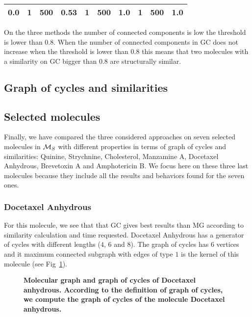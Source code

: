 \documentclass[10pt,letterpaper]{article}
\begin{document}
\begin{table}[!ht]
\begin{adjustwidth}{-0.75in}{0in}
\begin{tabular}{|p{1.5cm}|p{0.8cm}|p{0.8cm}|p{0.8cm}|p{0.8cm}|p{0.8cm}|p{0.8cm}|p{0.8cm}|p{0.8cm}|p{0.8cm}|}
\textbf{0.0} &1&500&0.53&1&500&1.0&1&500&1.0 \\ \hline

 \end{tabular}

\begin{flushleft} On the three methods the number of connected components is low the threshold is lower than $0.8$. When the number of connected components in GC does not increase when the threshold is lower than $0.8$ this means that two molecules with a similarity on GC bigger than $0.8$ are structurally similar.

\end{flushleft}

\label{table4}

\end{adjustwidth}

\end{table}

\subsection*{Graph of cycles and similarities}

\subsection*{Selected molecules}

Finally, we have  compared the three considered approaches  on seven selected molecules in ${\cal M}_S$ with different properties in terms of graph of cycles and similarities: Quinine, Strychnine, Cholesterol, Manzamine A, Docetaxel Anhydrous, Brevetoxin A and Amphotericin B. We focus here on these three last molecules  because they include all the results and behaviors found for the seven ones.


\subsubsection*{Docetaxel Anhydrous}

For this molecule, we see that that GC gives best results than MG according to similarity calculation and time requested. Docetaxel Anhydrous has a generator of cycles with different lengths ($4$, $6$ and $8$). The graph of cycles has $6$ vertices and it maximum connected subgraph with edges of type $1$ is the kernel of this molecule (see Fig~\ref{fig5}). 
 
\begin{figure}[!h]
	\caption{\bf{Molecular graph and graph of cycles of Docetaxel anhydrous. }
	According to the definition of graph of cycles, we compute the graph of cycles of the molecule Docetaxel anhydrous.}
	\label{fig5}
\end{figure}
 
\end{document}
